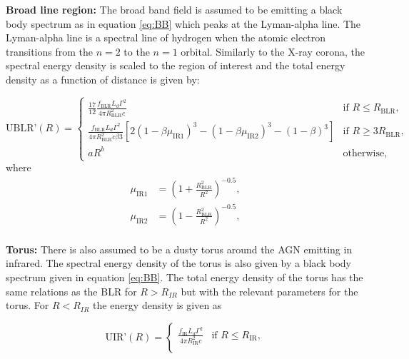 \textbf{Broad line region:} The broad band field is assumed to be emitting a black body spectrum as in equation \ref{eq:BB} which peaks at the Lyman-alpha line. The Lyman-alpha line is a spectral line of hydrogen when the atomic electron transitions from the $n=2$ to the $n=1$ orbital.
Similarly to the X-ray corona, the spectral energy density is scaled to the region of interest and the total energy density as a function of distance is given by: 

\begin{equation}
    \label{eq:UBLR}
    \text{UBLR'}(R) = 
    \begin{cases}
    \frac{17}{12}\frac{f_{\text{BLR}} L_{d} \Gamma^2}{4\pi R_{\text{BLR}}^2 c} & \text{if } R \leq R_{\text{BLR}}, \\
    \frac{f_{\text{BLR}} L_{d} \Gamma^2}{4 \pi R_{\text{BLR}}^2 c \beta 3} \left[2 (1 - \beta \mu_{\text{IR1}})^3 - (1 - \beta \mu_{\text{IR2}})^3 - (1 - \beta)^3\right] & \text{if } R \geq 3R_{\text{BLR}}, \\
    a R^b & \text{otherwise},
    \end{cases}  
\end{equation}
where 
\begin{align*}
    \mu_{\text{IR1}} &= \left(1 + \frac{R_{\text{BLR}}^2}{R^2}\right)^{-0.5}, \\
    \mu_{\text{IR2}} &= \left(1 - \frac{R_{\text{BLR}}^2}{R^2}\right)^{-0.5}, \\
\end{align*}

\textbf{Torus:} There is also assumed to be a dusty torus around the AGN emitting in infrared. The spectral energy density of the torus is also given by 
a black body spectrum given in equation \ref{eq:BB}. The total energy density of the torus has the same relations 
as the BLR for $R>R_{IR}$ but with the relevant parameters for the torus. For $R<R_{IR}$ the energy density is given as

\begin{equation}
    \text{UIR'}(R) = 
    \begin{cases}
    \frac{f_{\text{IR}}L_d \Gamma^2}{4 \pi R_{\text{IR}}^2 c} & \text{if } R \leq R_{\text{IR}}, \\
    \end{cases}
\end{equation}


